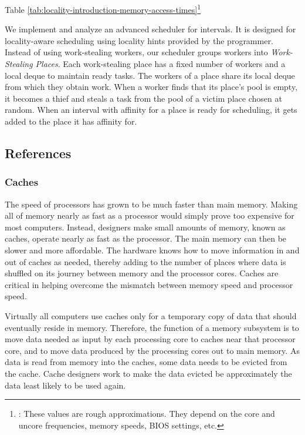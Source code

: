 Table
\ref{tab:locality-introduction-memory-access-times}\footnote{\cite{Levinthal2009}:
  These values are rough approximations. They depend on the core and
  uncore frequencies, memory speeds, BIOS settings, etc.}

We implement and analyze an advanced scheduler for intervals. It is
designed for locality-aware scheduling using locality hints provided
by the programmer. Instead of using work-stealing workers, our
scheduler groups workers into \emph{Work-Stealing Places}.  Each
work-stealing place has a fixed number of workers and a local deque to
maintain ready tasks. The workers of a place share its local deque
from which they obtain work. When a worker finds that its place's pool
is empty, it becomes a thief and steals a task from the pool of a
victim place chosen at random. When an interval with affinity for a
place is ready for scheduling, it gets added to the place it has
affinity for.


\subsection*{References}

\subsubsection{Caches}

The speed of processors has grown to be much faster than main
memory. Making all of memory nearly as fast as a processor would
simply prove too expensive for most computers. Instead, designers make
small amounts of memory, known as caches, operate nearly as fast as
the processor. The main memory can then be slower and more
affordable. The hardware knows how to move information in and out of
caches as needed, thereby adding to the number of places where data is
shuffled on its journey between memory and the processor cores. Caches
are critical in helping overcome the mismatch between memory speed and
processor speed.

Virtually all computers use caches only for a temporary copy of data
that should eventually reside in memory. Therefore, the function of a
memory subsystem is to move data needed as input by each processing
core to caches near that processor core, and to move data produced by
the processing cores out to main memory. As data is read from memory
into the caches, some data needs to be evicted from the cache. Cache
designers work to make the data evicted be approximately the data
least likely to be used again.

